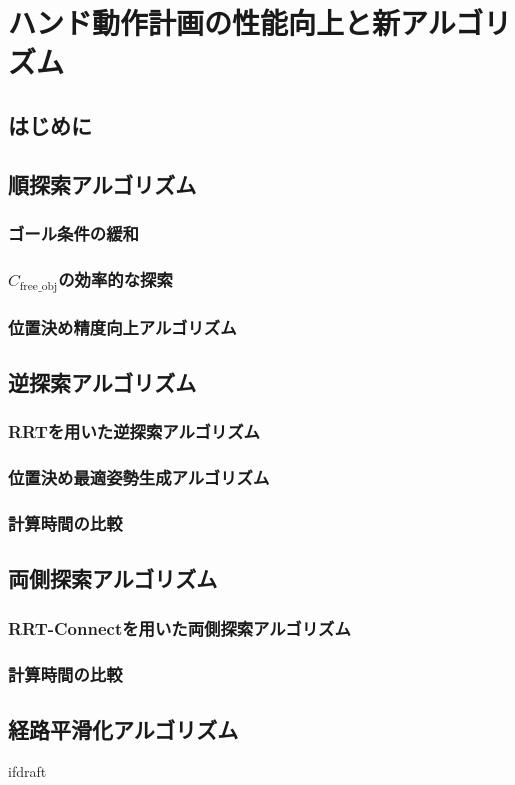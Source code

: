 \documentclass[a4paper,twoside,12pt,papersize, dvipdfmx]{iirthesis}
\begin{document}
    \newcommand{\figref}[1]{\figurename\ref{#1}}
    \newcommand{\tabref}[1]{\tablename\ref{#1}}
    \renewcommand{\eqref}[1]{式~(\ref{#1})}
    \newcommand{\chapref}[1]{\ref{#1}章}
    \newcommand{\secref}[1]{\ref{#1}節}
    \newcommand{\ssecref}[1]{\ref{#1}項}
    \newcommand{\appref}[1]{付録\ref{#1}}
\fi


\chapter{ハンド動作計画の性能向上と新アルゴリズム}\label{chap::planner}
\minitoc

\section{はじめに}\label{sec::planner::intro}

\section{順探索アルゴリズム}
\subsection{ゴール条件の緩和}
\subsection{$C_{\mathrm{free\_obj}}$の効率的な探索}
\subsection{位置決め精度向上アルゴリズム}

\section{逆探索アルゴリズム}
\subsection{RRTを用いた逆探索アルゴリズム}
\subsection{位置決め最適姿勢生成アルゴリズム}
\subsection{計算時間の比較}


\section{両側探索アルゴリズム}
\subsection{RRT-Connectを用いた両側探索アルゴリズム}
\subsection{計算時間の比較}

\section{経路平滑化アルゴリズム}



\expandafter\ifx\csname ifdraft\endcsname\relax
    
\end{document}
